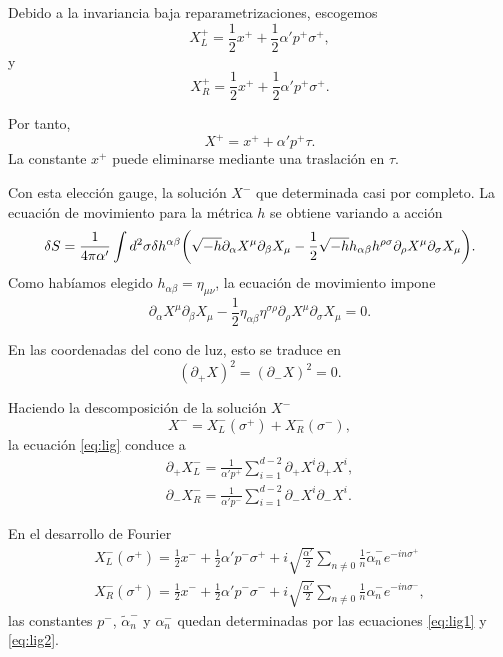 Debido a la invariancia baja reparametrizaciones, escogemos
\begin{equation}
  X^+_L=\frac 1 2 x^+ + \frac 1 2 \alpha' p^+ \sigma^+,
\end{equation}
y
\begin{equation}
  X^+_R=\frac 1 2 x^+ + \frac 1 2 \alpha' p^+ \sigma^+.
\end{equation}

Por tanto, 
\begin{equation}
  X^+ = x^+ + \alpha' p^+ \tau.
\end{equation}
La constante $x^+$ puede eliminarse mediante una traslación en $\tau$.

Con esta elección gauge, la solución $X^-$ que determinada casi por completo.
La ecuación de movimiento para la métrica $h$ se obtiene variando a acción
\begin{equation}
  \delta S = \frac{1}{4\pi\alpha'}\int d^2\sigma \delta h^{\alpha\beta}
  \qty(
  \sqrt{-h}\partial_\alpha X^\mu \partial_\beta X_\mu -
  \frac 1 2 \sqrt{-h}h_{\alpha\beta}h^{\rho\sigma} \partial_\rho X^\mu \partial_\sigma X_\mu).
\end{equation}
Como habíamos elegido $h_{\alpha\beta}=\eta_{\mu\nu}$, la ecuación de movimiento impone
\begin{equation}
  \partial_\alpha X^\mu \partial_\beta X_\mu - \frac 1 2 \eta_{\alpha\beta} \eta^{\sigma\rho} 
  \partial_\rho X^\mu  \partial_\sigma X_\mu = 0.
\end{equation}

En las coordenadas del cono de luz, esto se traduce en
\begin{equation}
  (\partial_+ X)^2 = (\partial_- X)^2 = 0.
  \label{eq:lig}
\end{equation}

Haciendo la descomposición de la solución $X^-$ 
\begin{equation}
  X^-=X^-_L(\sigma^+)+X^-_R(\sigma^-),
\end{equation}
la ecuación \ref{eq:lig} conduce a 
  \begin{align}
    \partial_+ X_L^- = \frac{1}{\alpha'p^+}\sum_{i=1}^{d-2} \partial_+ X^i \partial_+ X^i, \label{eq:lig1}\\
    \partial_- X_R^- = \frac{1}{\alpha'p^-}\sum_{i=1}^{d-2} \partial_- X^i \partial_- X^i. \label{eq:lig2}
  \end{align}

En el desarrollo de Fourier
\begin{equation}
  \begin{gathered}
    X^-_L(\sigma^+)=\frac 1 2 x^- + \frac 1 2 \alpha' p^- \sigma^+ + i\sqrt{\frac{ \alpha'}{ 2}}
    \sum_{n\neq0} \frac 1 n \tilde{\alpha}^-_n e^{-in\sigma^+} \\                             
    X^-_R(\sigma^+)=\frac 1 2 x^- + \frac 1 2 \alpha' p^- \sigma^- + i\sqrt{\frac{ \alpha'}{ 2}}
    \sum_{n\neq0} \frac 1 n \alpha^-_n e^{-in\sigma^-},
  \end{gathered}
\end{equation}
las constantes $p^-$, $\tilde \alpha^-_n$ y $\alpha^-_n$ quedan determinadas por las ecuaciones
\ref{eq:lig1} y \ref{eq:lig2}.

